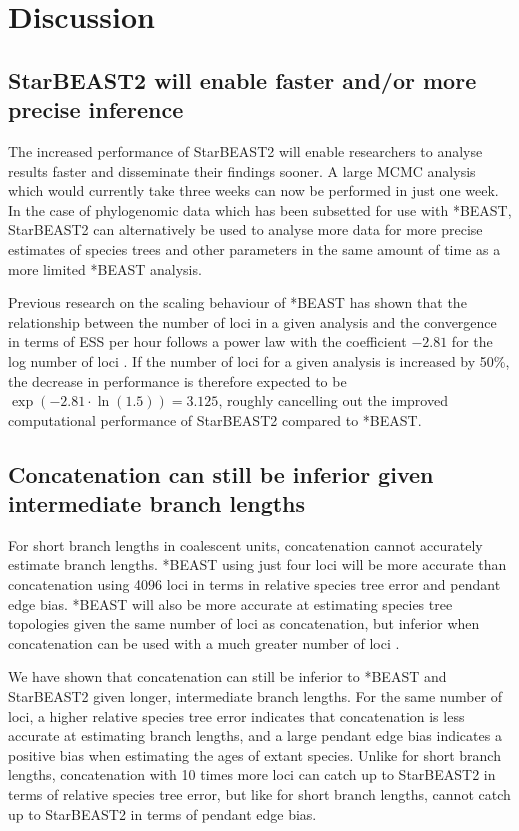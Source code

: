 \documentclass[12pt]{article}
\begin{document}
\clearpage

\section*{Discussion}

\subsection*{StarBEAST2 will enable faster and/or more precise inference}

The increased performance of StarBEAST2 will enable researchers to analyse
results faster and disseminate their findings sooner. A large MCMC analysis
which would currently take three weeks can now be performed in just one week. In
the case of phylogenomic data which has been subsetted for use with *BEAST,
StarBEAST2 can alternatively be used to analyse more data for more precise
estimates of species trees and other parameters in the same amount of time as a
more limited *BEAST analysis.

Previous research on the scaling behaviour of *BEAST has shown that the
relationship between the number of loci in a given analysis and the convergence
in terms of ESS per hour follows a power law with the coefficient $-2.81$ for the
log number of loci \citep{Ogilvie01052016}. If the number of loci for a given
analysis is increased by 50\%, the decrease in performance is therefore expected
to be $\exp(-2.81 \cdot \ln(1.5)) = 3.125$, roughly cancelling out the improved
computational performance of StarBEAST2 compared to *BEAST.

\subsection*{Concatenation can still be inferior given intermediate branch lengths}

For short branch lengths in coalescent units, concatenation cannot accurately
estimate branch lengths. *BEAST using just four loci will be more accurate than
concatenation using 4096 loci in terms in relative species tree error and
pendant edge bias. *BEAST will also be more accurate at estimating species tree
topologies given the same number of loci as concatenation, but inferior when
concatenation can be used with a much greater number of loci
\citep{Ogilvie01052016}.

We have shown that concatenation can still be inferior to *BEAST and StarBEAST2
given longer, intermediate branch lengths. For the same number of loci, a higher
relative species tree error indicates that concatenation is less accurate at
estimating branch lengths, and a large pendant edge bias indicates a positive bias when
estimating the ages of extant species. Unlike for short branch lengths,
concatenation with 10 times more loci can catch up to StarBEAST2 in terms of relative
species tree error, but like for short branch lengths, cannot catch up to StarBEAST2
in terms of pendant edge bias.
\end{document}
